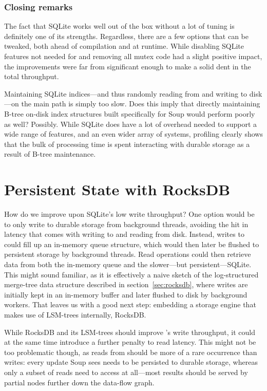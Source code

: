 
\subsubsection{Closing remarks}

The fact that SQLite works well out of the box without a lot of tuning is
definitely one of its strengths. Regardless, there are a few options that can be
tweaked, both ahead of compilation and at runtime. While disabling SQLite
features not needed for  and removing all mutex code had a
slight positive impact, the improvements were far from significant enough to
make a solid dent in the total throughput.

Maintaining SQLite indices---and thus randomly reading from and writing to
disk---on the main path is simply too slow. Does this imply that directly
maintaining B-tree on-disk index structures built specifically for Soup would
perform poorly as well? Possibly. While SQLite does have a lot of overhead
needed to support a wide range of features, and an even wider array of systems,
profiling clearly shows that the bulk of processing time is spent interacting
with durable storage as a result of B-tree maintenance.

\section{Persistent State with RocksDB}

How do we improve upon SQLite's low write throughput? One option would be to
only write to durable storage from background threads, avoiding the hit in
latency that comes with writing to and reading from disk. Instead, writes to
 could fill up an in-memory queue structure, which would
then later be flushed to persistent storage by background threads. Read
operations could then retrieve data from both the in-memory queue and the
slower---but persistent---SQLite. This might sound familiar, as it is
effectively a naive sketch of the log-structured merge-tree data structure
described in section~\ref{sec:rocksdb}, where writes are initially kept in an
in-memory buffer and later flushed to disk by background workers. That leaves us
with a good next step: embedding a storage engine that makes use of LSM-trees
internally, RocksDB.\@

While RocksDB and its LSM-trees should improve 's write
throughput, it could at the same time introduce a further penalty to read
latency. This might not be too problematic though, as reads from
 should be more of a rare occurrence than writes: every
update Soup sees needs to be persisted to durable storage, whereas only a subset
of reads need to access  at all---most results should be
served by partial nodes further down the data-flow graph.

